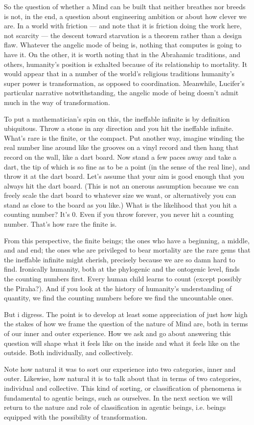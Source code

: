 So the question of whether a Mind can be built that neither breathes nor breeds is not, in the end, a question about engineering ambition or about how clever we are. In a world with friction --- and note that it is friction doing the work here, not scarcity --- the descent toward starvation is a theorem rather than a design flaw. Whatever the angelic mode of being is, nothing that computes is going to have it. On the other, it is worth noting that in the Abrahamic traditions, and others, humanity's position is exhalted because of its relationship to mortality. It would appear that in a number of the world's religious traditions humanity's super power is transformation, as opposed to coordination. Meanwhile, Lucifer's particular narrative notwithstanding, the angelic mode of being doesn't admit much in the way of transformation. 

To put a mathematician's spin on this, the ineffable infinite is by definition ubiquitous. Throw a stone in any direction and you hit the ineffable infinite. What's rare is the finite, or the compact. Put another way, imagine winding the real number line around like the grooves on a vinyl record and then hang that record on the wall, like a dart board. Now stand a few paces away and take a dart, the tip of which is so fine as to be a point (in the sense of the real line), and throw it at the dart board. Let's assume that your aim is good enough that you always hit the dart board. (This is not an onerous assumption because we can freely scale the dart board to whatever size we want, or alternatively you can stand as close to the board as you like.) What is the likelihood that you hit a counting number? It's 0. Even if you throw forever, you never hit a counting number. That's how rare the finite is.

From this perspective, the finite beings; the ones who have a beginning, a middle, and and end; the ones whe are privileged to bear mortality are the rare gems that the ineffable infinite might cherish, precisely because we are so damn hard to find. Ironically humanity, both at the phylogenic and the ontogenic level, finds the counting numbers first. Every human child learns to count (except possibly the Piraha?). And if you look at the history of humanity's understanding of quantity, we find the counting numbers before we find the uncountable ones.

But i digress. The point is to develop at least some appreciation of just how high the stakes of how we frame the question of the nature of Mind are, both in terms of our inner and outer experience. How we ask and go about answering this question will shape what it feels like on the inside and what it feels like on the outside. Both individually, and collectively. 

Note how natural it was to sort our experience into two categories, inner and outer. Likewise, how natural it is to talk about that in terms of two categories, individual and collective. This kind of sorting, or classification of phenomena is fundamental to agentic beings, such as ourselves. In the next section we will return to the nature and role of classification in agentic beings, i.e. beings equipped with the possibility of transformation.
